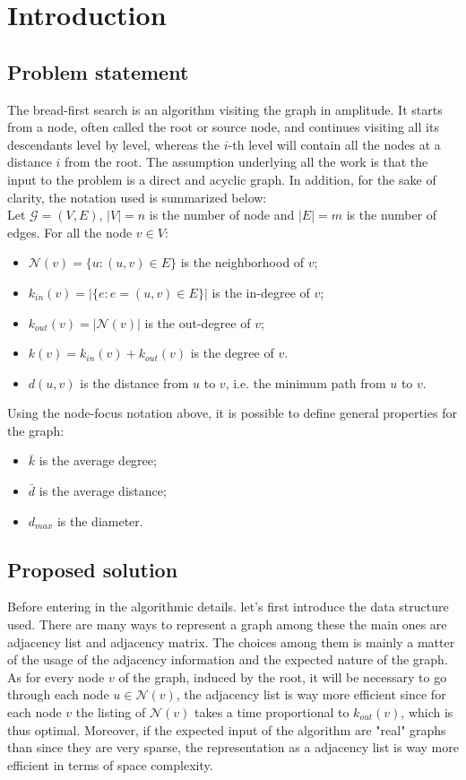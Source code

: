 \documentclass{article}
\begin{document}
\tableofcontents
\newpage


\section{Introduction}
\subsection{Problem statement}
The bread-first search is an algorithm visiting the graph in amplitude. It starts from a node, 
often called the root or source node, and continues visiting all its descendants level
by level, whereas the $i$-th level will contain all the nodes at a distance $i$ from the root. 
The assumption underlying all the work is that the input to the problem is a direct and 
acyclic graph. In addition, for the sake of clarity, the notation used is summarized below:
\\

Let $\mathcal{G} = (V, E)$, $|V| = n$ is the number of node and $|E| = m$ is the number of edges. 
For all the node $v \in V$:
\begin{itemize}
    \item $\mathcal{N}(v) = \{u : (u, v) \in E\}$ is the neighborhood of $v$;
    \item $k_{in}(v) = |\{e: e=(u, v) \in E\}|$ is the in-degree of $v$;
    \item $k_{out}(v) = |\mathcal{N}(v)|$ is the out-degree of $v$;
    \item $k(v) = k_{in}(v) + k_{out}(v)$ is the degree of $v$.
    \item $d(u, v)$ is the distance from $u$ to $v$, i.e. the minimum path from $u$ to $v$.
\end{itemize}
Using the node-focus notation above,
 it is possible to define general properties for the graph:
\begin{itemize}
    \item $\bar{k}$ is the average degree;
    \item $\bar{d}$ is the average distance;
    \item $d_{max}$ is the diameter.
\end{itemize}

\subsection{Proposed solution}
Before entering in the algorithmic details. let's first introduce the data structure used.
There are many ways to represent a graph among these the main ones are adjacency list and adjacency
matrix. The choices among them is mainly a matter of the usage of the adjacency information and the 
expected nature of the graph. As for every node $v$ of the graph, induced by the root, it will be necessary
to go through each node $u \in \mathcal{N}(v)$, the adjacency list is way more efficient since for each
node $v$ the listing of $\mathcal{N}(v)$ takes a time proportional to $k_{out}(v)$, which is thus optimal.
Moreover, if the expected input of the algorithm are "real" graphs than since they are very sparse, the representation as a adjacency list is way 
more efficient in terms of space complexity.  
\end{document}

